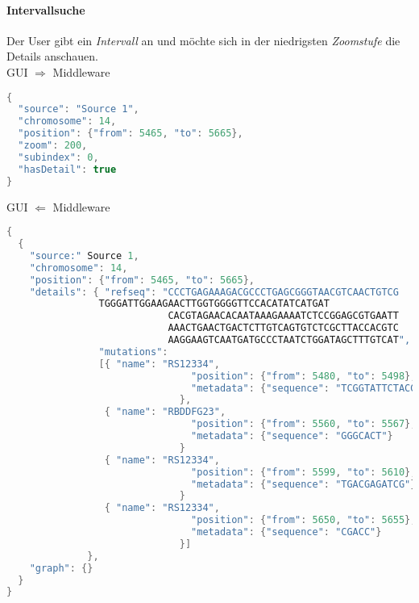 \paragraph{Intervallsuche} Der User gibt ein \textit{Intervall} an und möchte sich in der niedrigsten \textit{Zoomstufe} die Details anschauen.\\
\newline
GUI $\Rightarrow$ Middleware
\begin{lstlisting}[language=c,
commentstyle=\fontsize{12}{14.4}\selectfont,
basicstyle=\ttfamily\fontsize{10}{12}\selectfont]
{
  "source": "Source 1",
  "chromosome": 14,
  "position": {"from": 5465, "to": 5665},
  "zoom": 200,
  "subindex": 0,
  "hasDetail": true
}
\end{lstlisting}
GUI $\Leftarrow$ Middleware
\begin{lstlisting}[language=c,
commentstyle=\fontsize{12}{14.4}\selectfont,
basicstyle=\ttfamily\fontsize{10}{12}\selectfont,showstringspaces=false]
{
  {
    "source:" Source 1,
    "chromosome": 14,
    "position": {"from": 5465, "to": 5665},
    "details": { "refseq": "CCCTGAGAAAGACGCCCTGAGCGGGTAACGTCAACTGTCG
			    TGGGATTGGAAGAACTTGGTGGGGTTCCACATATCATGAT
                            CACGTAGAACACAATAAAGAAAATCTCCGGAGCGTGAATT
                            AAACTGAACTGACTCTTGTCAGTGTCTCGCTTACCACGTC
                            AAGGAAGTCAATGATGCCCTAATCTGGATAGCTTTGTCAT",
                "mutations": 
                [{ "name": "RS12334",
                                "position": {"from": 5480, "to": 5498},
                                "metadata": {"sequence": "TCGGTATTCTACGTCTGC"}
                              },
                 { "name": "RBDDFG23",
                                "position": {"from": 5560, "to": 5567},
                                "metadata": {"sequence": "GGGCACT"}
                              }
                 { "name": "RS12334",
                                "position": {"from": 5599, "to": 5610},
                                "metadata": {"sequence": "TGACGAGATCG"}
                              }
                 { "name": "RS12334",
                                "position": {"from": 5650, "to": 5655},
                                "metadata": {"sequence": "CGACC"}
                              }]
              },
    "graph": {}
  }
}
\end{lstlisting}
